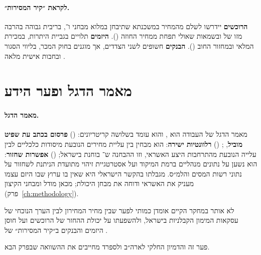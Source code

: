 \paragraph{לקראת ״קיר המסירות״.}\label{sec:ch3-wall} \textbf{הרוכשים} יידרשו לשלם  מהמחיר במשכנתא שתיבחן במלוא מבחני  ו־, בריבית גבוהה בהרבה מזו של  ובשמאות שאולי תפחת ממחיר החוזה (). \textbf{היזמים} תלויים בגביית היתרות, במכירת המלאי ובמחזור החוב (). \textbf{הבנקים} חשופים לשני הצדדים, אך מוגנים בחוק המכר, בליווי הסגור ובחבות אישית מלאה \cite{salelaw1974,boi_directive329}.

\section{מאמר הדגל ופער הידע}
\label{sec:ch3-flagship}

\paragraph{מאמר הדגל.} מאמר הדגל של העבודה הוא  \cite{mian2009}, והוא עומד בשלושה קריטריונים: () \textbf{פרסום בכתב עת שפיט מוביל}, ; () \textbf{רלוונטיות ישירה}: הוא מבחין בין עליית מחירים הנובעת מיסודות כלכליים לבין עלייה הנובעת מהתרחבות היצע האשראי, וזו ההבחנה ש־ בוחנת בישראל; () \textbf{אפשרות שחזור}: הוא נשען על נתונים מנהליים ברמת המיקוד ועל אסטרטגיית זיהוי מתועדת הניתנת לשחזור על נתוני רשות המסים והלמ״ס. מגבלתו בהקשר הישראלי היא שאין בו ערוץ שבו היזם עצמו מעניק את האשראי ודוחה את מבחן היכולת; מכאן מודל  ומבחני הקיצון (פרק~\ref{ch:methodology}).

\begin{keyfinding}
לא אותר במחקר הקיים אומדן כמותי לפער שבין מחיר המחירון לבין הערך הנוכחי של עסקאות המימון הקבלניות בישראל, ולהשפעתו על יכולת ההחזר של הרוכשים ועל חוסן היזמים והבנקים ב״קיר המסירות״ של .
\end{keyfinding}

פער זה והדמיון החלקי לארה״ב ולספרד מחייבים את ההשוואה שבפרק הבא.
